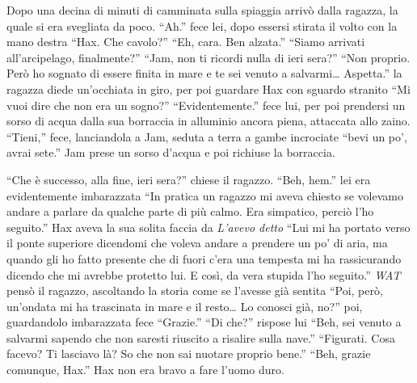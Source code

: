     Dopo una decina di minuti di camminata sulla spiaggia arrivò dalla
    ragazza, la quale si era svegliata da poco. ``Ah.'' fece lei, dopo
    essersi stirata il volto con la mano destra ``Hax. Che cavolo?'' ``Eh,
    cara. Ben alzata.'' ``Siamo arrivati all'arcipelago, finalmente?''
    ``Jam, non ti ricordi nulla di ieri sera?'' ``Non proprio. Però ho
    sognato di essere finita in mare e te sei venuto a salvarmi\dots{}
    Aspetta.'' la ragazza diede un'occhiata in giro, per poi guardare Hax
    con sguardo stranito ``Mi vuoi dire che non era un sogno?''
    ``Evidentemente.'' fece lui, per poi prendersi un sorso di acqua dalla
    sua borraccia in alluminio ancora piena, attaccata allo zaino. ``Tieni,'' fece,
    lanciandola a Jam, seduta a terra a gambe incrociate ``bevi un po',
    avrai sete.'' Jam prese un sorso d'acqua e poi richiuse la borraccia.

    ``Che è successo, alla fine, ieri sera?'' chiese il ragazzo. ``Beh,
    hem.'' lei era evidentemente imbarazzata ``In pratica un ragazzo mi
    aveva chiesto se volevamo andare a parlare da qualche parte di più
    calmo. Era simpatico, perciò l'ho seguito.'' Hax aveva la sua solita
    faccia da  \emph{L'avevo detto} ``Lui mi ha portato verso il ponte
    superiore dicendomi che voleva andare a prendere un po' di aria, ma
    quando gli ho fatto presente che di fuori c'era una tempesta mi ha
    rassicurando dicendo che mi avrebbe protetto lui. E così, da vera
    stupida l'ho seguito.'' \emph{WAT} pensò il ragazzo, ascoltando la
    storia come se l'avesse già sentita ``Poi, però, un'ondata mi ha
    trascinata in mare e il resto\dots{} Lo conosci già, no?'' poi,
    guardandolo imbarazzata fece ``Grazie.'' ``Di che?'' rispose lui ``Beh,
    sei venuto a salvarmi sapendo che non saresti riuscito a risalire sulla
    nave.'' ``Figurati. Cosa facevo? Ti lasciavo là? So che non sai nuotare
    proprio bene.'' ``Beh, grazie comunque, Hax.'' Hax non era bravo a fare
    l'uomo duro.

